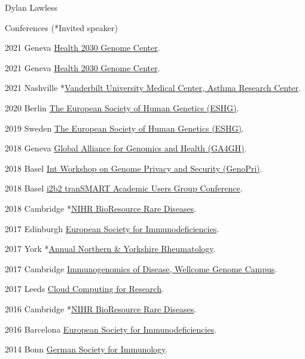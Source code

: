 \documentclass[12pt,a4paper]{article}
\begin{document}
\begin{cv}{Dylan Lawless}
\begin{cvlist}{Conferences \textnormal{(*Invited speaker)}} 
	\item[2021 Geneva]	\href{https://www.health2030genome.ch}{Health 2030 Genome Center}.
	\item [2021 Geneva] \href{https://www.health2030genome.ch}{Health 2030 Genome Center}.
	\item [2021 Nashville] *\href{https://www.vumc.org/medicine-public-health/}{Vanderbilt University Medical Center, Asthma Research Center}.
	\item [2020 Berlin] \href{https://www.eshg.org/}{The European Society
of Human Genetics (ESHG)}.
	\item [2019 Sweden] \href{https://www.eshg.org/}{The European Society
of Human Genetics (ESHG)}.
	\item [2018 Geneva] \href{https://broadinstitute.swoogo.com/ga4gh6thplenary}{Global Alliance for Genomics and Health (GA4GH)}.
	\item [2018 Basel] \href{https://www.genopri.org}{Int Workshop on Genome Privacy and Security (GenoPri)}.
	\item [2018 Basel] \href{https://transmartfoundation.org/europe-fall-meeting-2018/}{i2b2 tranSMART Academic Users Group Conference}.
	\item [2018 Cambridge] *\href{https://www.cambridgebioresource.group.cam.ac.uk/volunteers/rare}{NIHR BioResource Rare Diseases}.
  \item [2017 Edinburgh] \href{http://esid2017.kenes.com/}{European Society for Immunodeficiencies}.  
  \item [2017 York] *\href{https://medhealth.leeds.ac.uk/events/event/86/combined_northern_and_yorkshire_annual_rheumatology_meeting_national_railway_museum_york}{Annual Northern \& Yorkshire Rheumatology}.
  \item [2017 Cambridge] \href{https://coursesandconferences.wellcomegenomecampus.org/Conferences.wt}{Immunogenomics of Disease, Wellcome Genome Campus}.
  \item [2017 Leeds]  \href{http://arc.leeds.ac.uk}{Cloud Computing for Research}.
  \item [2016 Cambridge] *\href{http://www.cambridgebioresource.group.cam.ac.uk/volunteers/rare}{NIHR BioResource Rare Diseases}.
  \item [2016 Barcelona] \href{http://esid.org/}{European Society for Immunodeficiencies}.
  \item [2014 Bonn] \href{http://www.immunology-conference.de/}{German Society for Immunology}.
  \end{cvlist}
  

\end{cv}
\end{document}
